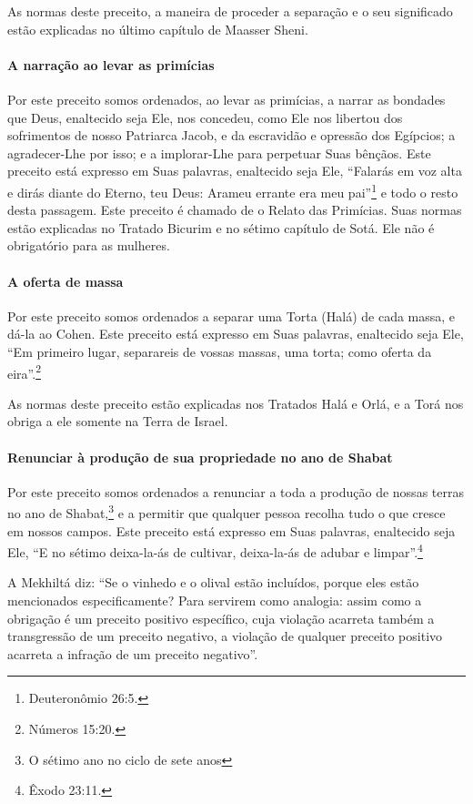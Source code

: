 As normas deste preceito, a maneira de proceder a separação e o seu
significado estão explicadas no último capítulo de Maasser Sheni.


\paragraph{A narração ao levar as primícias}

Por este preceito somos ordenados, ao levar as primícias, a narrar as
bondades que Deus, enaltecido seja Ele, nos concedeu, como Ele nos
libertou dos sofrimentos de nosso Patriarca Jacob, e da escravidão e
opressão dos Egípcios; a agradecer-Lhe por isso; e a implorar-Lhe para
perpetuar Suas bênçãos. Este preceito está expresso em Suas palavras,
enaltecido seja Ele, ``Falarás em voz alta e dirás diante do Eterno, teu
Deus: Arameu errante era meu pai''\footnote{Deuteronômio 26:5.} e todo o resto
desta passagem. Este preceito é chamado de o Relato das Primícias. Suas
normas estão explicadas no Tratado Bicurim e no sétimo capítulo de Sotá.
Ele não é obrigatório para as mulheres.

\paragraph{A oferta de massa}

Por este preceito somos ordenados a separar uma Torta (Halá) de cada
massa, e dá-la ao Cohen. Este preceito está expresso em Suas
palavras, enaltecido seja Ele, ``Em primeiro lugar, separareis de vossas
massas, uma torta; como oferta da eira''.\footnote{Números 15:20.}

As normas deste preceito estão explicadas nos Tratados Halá e Orlá, e a
Torá nos obriga a ele somente na Terra de Israel.

\paragraph{Renunciar à produção de sua propriedade no ano de Shabat}

Por este preceito somos ordenados a renunciar a toda a produção de
nossas terras no ano de Shabat,\footnote{O sétimo ano no ciclo de sete anos} e a permitir que
qualquer pessoa recolha tudo o que cresce em nossos campos. Este
preceito está expresso em Suas palavras, enaltecido seja Ele, ``E no
sétimo deixa-la-ás de cultivar, deixa-la-ás de adubar e limpar''.\footnote{Êxodo
23:11.}

A Mekhiltá diz: ``Se o vinhedo e o olival estão incluídos, porque eles
estão mencionados especificamente? Para servirem como analogia: assim
como a obrigação é um preceito positivo específico, cuja violação
acarreta também a transgressão de um preceito negativo, a violação de
qualquer preceito positivo acarreta a infração de um preceito
negativo''.

